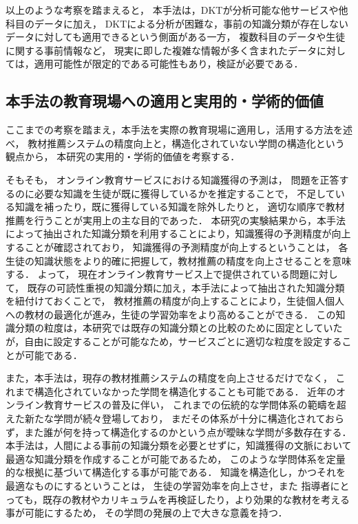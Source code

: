以上のような考察を踏まえると，
本手法は，DKTが分析可能な他サービスや他科目のデータに加え，
DKTによる分析が困難な，事前の知識分類が存在しないデータに対しても適用できるという側面がある一方，
複数科目のデータや生徒に関する事前情報など，
現実に即した複雑な情報が多く含まれたデータに対しては，適用可能性が限定的である可能性もあり，検証が必要である．


\subsection{本手法の教育現場への適用と実用的・学術的価値}
ここまでの考察を踏まえ，本手法を実際の教育現場に適用し，活用する方法を述べ，
教材推薦システムの精度向上と，構造化されていない学問の構造化という観点から，
本研究の実用的・学術的価値を考察する．


そもそも，
オンライン教育サービスにおける知識獲得の予測は，
問題を正答するのに必要な知識を生徒が既に獲得しているかを推定することで，
不足している知識を補ったり，既に獲得している知識を除外したりと，
適切な順序で教材推薦を行うことが実用上の主な目的であった．
本研究の実験結果から，本手法によって抽出された知識分類を利用することにより，知識獲得の予測精度が向上することが確認されており，
知識獲得の予測精度が向上するということは，
各生徒の知識状態をより的確に把握して，教材推薦の精度を向上させることを意味する．
よって，
現在オンライン教育サービス上で提供されている問題に対して，
既存の可読性重視の知識分類に加え，本手法によって抽出された知識分類を紐付けておくことで，
教材推薦の精度が向上することにより，生徒個人個人への教材の最適化が進み，生徒の学習効率をより高めることができる．
この知識分類の粒度は，本研究では既存の知識分類との比較のために固定としていたが，自由に設定することが可能なため，サービスごとに適切な粒度を設定することが可能である．


また，本手法は，現存の教材推薦システムの精度を向上させるだけでなく，
これまで構造化されていなかった学問を構造化することも可能である．
近年のオンライン教育サービスの普及に伴い，
これまでの伝統的な学問体系の範疇を超えた新たな学問が続々登場しており，
まだその体系が十分に構造化されておらず，また誰が何を持って構造化するのかという点が曖昧な学問が多数存在する．
本手法は，人間による事前の知識分類を必要とせずに，知識獲得の文脈において最適な知識分類を作成することが可能であるため，
このような学問体系を定量的な根拠に基づいて構造化する事が可能である．
知識を構造化し，かつそれを最適なものにするということは，
生徒の学習効率を向上させ，また
指導者にとっても，既存の教材やカリキュラムを再検証したり，より効果的な教材を考える事が可能にするため，
その学問の発展の上で大きな意義を持つ．

